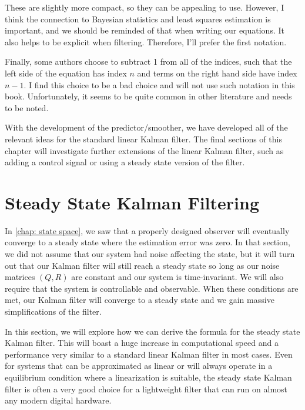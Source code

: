These are slightly more compact, so they can be appealing to use. However, I think the connection to Bayesian statistics and least squares estimation is important, and we should be reminded of that when writing our equations. It also helps to be explicit when filtering. Therefore, I'll prefer the first notation.

Finally, some authors choose to subtract 1 from all of the indices, such that the left side of the equation has index $n$ and terms on the right hand side have index $n-1$. I find this choice to be a bad choice and will not use such notation in this book. Unfortunately, it seems to be quite common in other literature and needs to be noted.

With the development of the predictor/smoother, we have developed all of the relevant ideas for the standard linear Kalman filter. The final sections of this chapter will investigate further extensions of the linear Kalman filter, such as adding a control signal or using a steady state version of the filter.


\section{Steady State Kalman Filtering}

In \autoref{chap: state space}, we saw that a properly designed observer will eventually converge to a steady state where the estimation error was zero. In that section, we did not assume that our system had noise affecting the state, but it will turn out that our Kalman filter will still reach a steady state so long as our noise matrices $(Q,R)$ are constant and our system is time-invariant. We will also require that the system is controllable and observable. When these conditions are met, our Kalman filter will converge to a steady state and we gain massive simplifications of the filter.

In this section, we will explore how we can derive the formula for the steady state Kalman filter. This will boast a huge increase in computational speed and a performance very similar to a standard linear Kalman filter in most cases. Even for systems that can be approximated as linear or will always operate in a equilibrium condition where a linearization is suitable, the steady state Kalman filter is often a very good choice for a lightweight filter that can run on almost any modern digital hardware.

